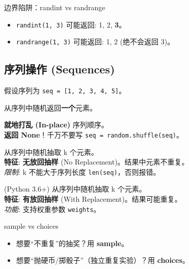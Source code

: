 \documentclass[12pt, a4paper]{article}
\begin{document}
\begin{trapbox}{边界陷阱：randint vs randrange}
\begin{itemize}
    \item \texttt{randint(1, 3)} 可能返回: 1, 2, \textbf{3}。
    \item \texttt{randrange(1, 3)} 可能返回: 1, 2 (绝不会返回 3)。
\end{itemize}
\end{trapbox}

\subsection{序列操作 (Sequences)}

假设序列为 \texttt{seq = [1, 2, 3, 4, 5]}。

\begin{description}[style=multiline, leftmargin=4cm]
    \item[.choice(seq)] 
    从序列中随机返回\textbf{一个}元素。
    
    \item[.shuffle(seq)] 
    \textbf{就地打乱 (In-place)} 序列顺序。
    \\ \textbf{返回 None}！千万不要写 \texttt{seq = random.shuffle(seq)}。
    
    \item[.sample(seq, k)] 
    从序列中随机抽取 k 个元素。
    \\ \textbf{特征}: \textbf{无放回抽样} (No Replacement)。结果中元素不重复。
    \\ \textit{限制}: k 不能大于序列长度 \texttt{len(seq)}，否则报错。
    
    \item[.choices(seq, k)] 
    (Python 3.6+) 从序列中随机抽取 k 个元素。
    \\ \textbf{特征}: \textbf{有放回抽样} (With Replacement)。结果可能重复。
    \\ \textit{功能}: 支持权重参数 \texttt{weights}。
\end{description}

\begin{importantbox}{sample vs choices}
\begin{itemize}
    \item 想要“不重复”的抽奖？用 \textbf{sample}。
    \item 想要“抛硬币/掷骰子”（独立重复实验）？用 \textbf{choices}。
\end{itemize}
\end{importantbox}
\end{document}
